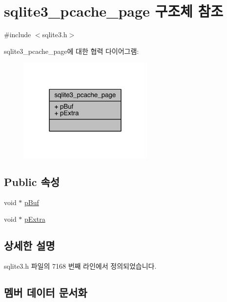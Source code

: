 \hypertarget{structsqlite3__pcache__page}{}\section{sqlite3\+\_\+pcache\+\_\+page 구조체 참조}
\label{structsqlite3__pcache__page}


{\ttfamily \#include $<$sqlite3.\+h$>$}



sqlite3\+\_\+pcache\+\_\+page에 대한 협력 다이어그램\+:
\nopagebreak
\begin{figure}[H]
\begin{center}
\leavevmode
\includegraphics[width=190pt]{structsqlite3__pcache__page__coll__graph}
\end{center}
\end{figure}
\subsection*{Public 속성}
\begin{DoxyCompactItemize}
\item 
void $\ast$ \hyperlink{structsqlite3__pcache__page_a19aa6f5638fe2d4eee32aed37a119288}{p\+Buf}
\item 
void $\ast$ \hyperlink{structsqlite3__pcache__page_a6356a15fc426a7558ddf34038f70a65f}{p\+Extra}
\end{DoxyCompactItemize}


\subsection{상세한 설명}


sqlite3.\+h 파일의 7168 번째 라인에서 정의되었습니다.



\subsection{멤버 데이터 문서화}
\mbox{\label{structsqlite3__pcache__page_a19aa6f5638fe2d4eee32aed37a119288}} 
